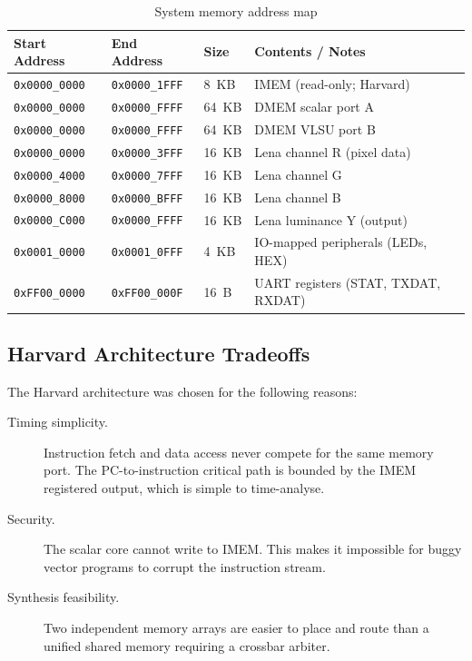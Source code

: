 \begin{table}[H]
\centering
\caption{System memory address map}
\label{tab:memmap}
\begin{tabular}{llll}
\toprule
\textbf{Start Address} & \textbf{End Address} & \textbf{Size} & \textbf{Contents / Notes} \\
\midrule
\texttt{0x0000\_0000} & \texttt{0x0000\_1FFF} & 8~KB   & IMEM (read-only; Harvard)  \\
\texttt{0x0000\_0000} & \texttt{0x0000\_FFFF} & 64~KB  & DMEM scalar port A        \\
\texttt{0x0000\_0000} & \texttt{0x0000\_FFFF} & 64~KB  & DMEM VLSU port B          \\
\texttt{0x0000\_0000} & \texttt{0x0000\_3FFF} & 16~KB  & Lena channel R (pixel data) \\
\texttt{0x0000\_4000} & \texttt{0x0000\_7FFF} & 16~KB  & Lena channel G \\
\texttt{0x0000\_8000} & \texttt{0x0000\_BFFF} & 16~KB  & Lena channel B \\
\texttt{0x0000\_C000} & \texttt{0x0000\_FFFF} & 16~KB  & Lena luminance Y (output)  \\
\texttt{0x0001\_0000} & \texttt{0x0001\_0FFF} & 4~KB   & IO-mapped peripherals (LEDs, HEX) \\
\texttt{0xFF00\_0000} & \texttt{0xFF00\_000F} & 16~B   & UART registers (STAT, TXDAT, RXDAT) \\
\bottomrule
\end{tabular}
\end{table}

\subsection{Harvard Architecture Tradeoffs}
\label{subsec:harvard_tradeoffs}

The Harvard architecture was chosen for the following reasons:

\begin{description}
  \item[Timing simplicity.] Instruction fetch and data access never compete for the
    same memory port. The PC-to-instruction critical path is bounded by the IMEM
    registered output, which is simple to time-analyse.
  \item[Security.] The scalar core cannot write to IMEM. This makes it impossible
    for buggy vector programs to corrupt the instruction stream.
  \item[Synthesis feasibility.] Two independent memory arrays are easier to place and
    route than a unified shared memory requiring a crossbar arbiter.
\end{description}

